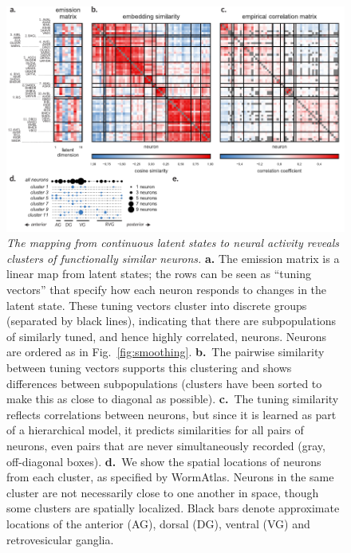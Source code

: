 \documentclass[11pt]{article}
\begin{document}
\begin{figure}[t!]
\centering
\includegraphics[width=6in]{figures/v3/figure3B} 
\caption{ \textit{The mapping from continuous latent states to neural
    activity reveals clusters of functionally similar neurons.}
  \textbf{a.} The emission matrix is a linear map from latent states;
  the rows can be seen as ``tuning vectors'' that specify how each
  neuron responds to changes in the latent state.  These tuning
  vectors cluster into discrete groups (separated by black lines),
  indicating that there are subpopulations of similarly tuned, and
  hence highly correlated, neurons. Neurons are ordered as in
  Fig.~\ref{fig:smoothing}. \textbf{b.}~The pairwise similarity between
  tuning vectors supports this clustering and shows differences
  between subpopulations (clusters have been sorted to make this as
  close to diagonal as possible).  \textbf{c.}~The tuning similarity
  reflects correlations between neurons, but since it is learned as
  part of a hierarchical model, it predicts similarities for all pairs
  of neurons, even pairs that are never simultaneously recorded (gray,
  off-diagonal boxes).  \textbf{d.}~We show the spatial locations of
  neurons from each cluster, as specified by WormAtlas.  Neurons in
  the same cluster are not necessarily close to one another in space,
  though some clusters are spatially localized. Black bars denote
  approximate locations of the anterior (AG), dorsal (DG), ventral
  (VG) and retrovesicular ganglia.}
\label{fig:clustering}
\end{figure}
\end{document}
